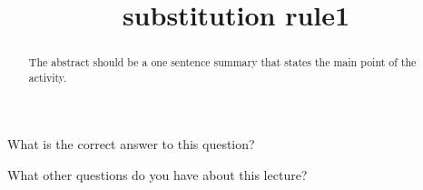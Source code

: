 \documentclass{ximera}
\title{substitution rule1}
\begin{document}
\begin{abstract}
  The abstract should be a one sentence summary that states the main point of the activity.
\end{abstract}

\maketitle

\begin{question}
  What is the correct answer to this question?

  
    \begin{multipleChoice}
    \end{multipleChoice}  
  
\end{question}

What other questions do you have about this lecture?
\begin{question}
  \begin{freeResponse}
  \end{freeResponse}
\end{question}
\end{document}
